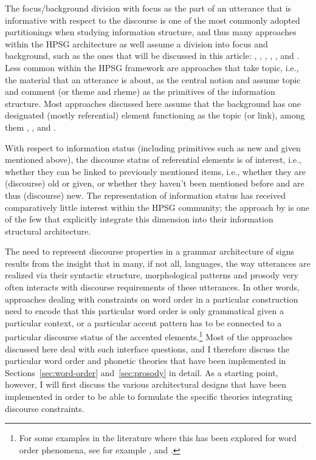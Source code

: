 \documentclass[output=paper
 	        ,biblatex
                ,babelshorthands
                ,newtxmath
                ,draftmode
                ,colorlinks, citecolor=brown
]{langscibook}
\begin{document}
The focus/background division with focus as the part of an utterance
that is informative with respect to the discourse is one of the most
commonly adopted partitionings when studying information structure, and
thus many approaches within the HPSG architecture as well assume a
division into focus and background, such as the ones that will be
discussed in this article: \cite{EV96a}, \cite{deKuthy2002a},
\cite{Webelhuth2007a-u}, \cite{Paggio2009a-u}, \cite{Bildhauer2008a},
\cite{song-bender:2012} and \cite{song2018}. Less common within the
HPSG framework are approaches that take topic, i.e., the material that
an utterance is about, as the central notion and assume topic and
comment (or theme and rheme) as the primitives of the information
structure. Most approaches discussed here assume that the background
has one designated (mostly referential) element functioning as the
topic (or link), among them \cite{EV96a}, \cite{deKuthy2002a},
\cite{Paggio2009a-u} and \cite{song2018}.

With respect to information status (including primitives such as new and
given mentioned above), the discourse status of referential elements is of
interest, i.e., whether they can be linked to previously mentioned
items, i.e., whether they are (discourse) old or given, or whether they
haven't been mentioned before and are thus (discourse) new. The
representation of information status has received comparatively little
interest within the HPSG community; the approach by
\cite{DeKuthy.Meurers-11} is one of the few that
explicitly integrate this dimension into their information structural
architecture.

The need to represent discourse properties in a grammar architecture
of signs results from the insight that in many, if not all, languages,
the way utterances are realized via their syntactic structure,
morphological patterns and prosody very often interacts with discourse
requirements of these utterances. In other words, approaches dealing
with constraints on word order in a particular construction need to
encode that this particular word order is only grammatical given a
particular context, or a particular accent pattern has to be connected
to a particular discourse status of the accented elements.\footnote{For some examples in the literature where this has been explored for word order phenomena, see for example \citet{ambridge.goldberg-08}, \citet{DeKuthy.Konietzko-19} and \citet{Culicover.Winkler-19}. }
Most of the approaches discussed here deal with such interface
questions, and I therefore discuss the particular word order and
phonetic theories that have been implemented in Sections~\ref{sec:word-order}
and~\ref{sec:prosody} in detail. As a starting point, however, I will first
discuss the various architectural designs that have been implemented in
order to be able to formulate the specific theories integrating
discourse constraints.
\end{document}
